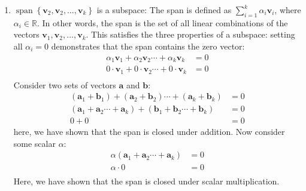 \begin{enumerate}[label=(\alph*)]
\begin{enumerate}[label=\roman*.]
		      \item $\operatorname{span}\left\{\mathbf{v}_{2},
			            \mathbf{v}_{2}, \ldots, \mathbf{v}_{k}\right\}$ is a subspace:
		            The span is defined as $\sum_{i=1}^{k} \alpha_i \mathbf{v}_i$,
		            where $\alpha_i \in \mathbb{R}$. In other words, the span is the set
		            of all linear combinations of the vectors $\mathbf{v}_1, \mathbf{v}_2,
			            \ldots, \mathbf{v}_{k}$. This satisfies the three properties of a
		            subspace: setting all $\alpha_i = 0$ demonstrates that the span
		            contains the zero vector:
		            $$
			            \begin{aligned}
				            \alpha_1\mathbf{v}_1 + \alpha_2\mathbf{v}_2 \cdots +
				            \alpha_k\mathbf{v}_k & = 0 \\
				            0 \cdot \mathbf{v}_1 + 0 \cdot \mathbf{v}_2 \cdots +
				            0 \cdot \mathbf{v}_k & = 0 \\
			            \end{aligned}
		            $$
		            Consider two sets of vectors $\mathbf{a}$ and $\mathbf{b}$:
		            $$
			            \begin{aligned}
				            (\mathbf{a}_1 + \mathbf{b}_1) +
				            (\mathbf{a}_2 + \mathbf{b}_2) \cdots +
				            (\mathbf{a}_k + \mathbf{b}_k) & = 0 \\
				            (\mathbf{a}_1 + \mathbf{a}_2 \cdots + \mathbf{a}_k) +
				            (\mathbf{b}_1 + \mathbf{b}_2 \cdots + \mathbf{b}_k)
				                                          & = 0 \\
				            0 + 0                         & = 0
			            \end{aligned}
		            $$
		            here, we have shown that the span is closed under addition.
		            Now consider some scalar $\alpha$:
		            $$
			            \begin{aligned}
				            \alpha(\mathbf{a}_1 + \mathbf{a}_2 \cdots + \mathbf{a}_k) & = 0 \\
				            \alpha \cdot 0                                            & = 0 \\
			            \end{aligned}
		            $$
		            Here, we have shown that the span is closed under scalar
		            multiplication.


	      \end{enumerate}


\end{enumerate}

